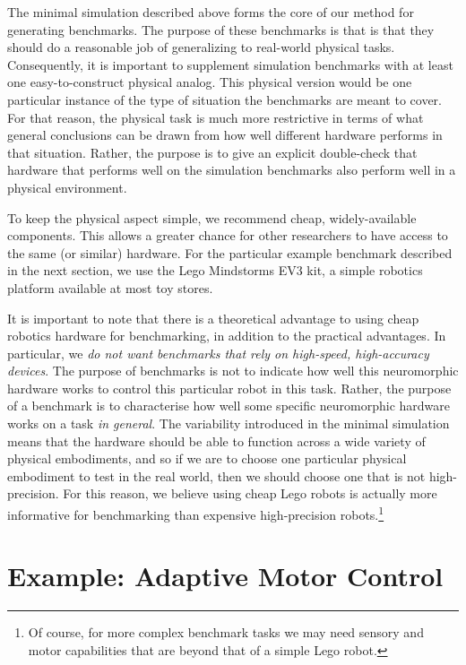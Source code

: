 \documentclass{frontiersSCNS} %
\begin{document}
The minimal simulation described above forms the core of our method for generating benchmarks.
The purpose of these benchmarks is that is that they should do a reasonable job
of generalizing to real-world physical tasks.  Consequently, it is important to
supplement simulation benchmarks with at least one easy-to-construct 
physical analog.  This physical version would be one particular instance of the
type of situation the benchmarks are meant to cover.  For that reason, the physical task
is much more restrictive in terms of what general conclusions can be drawn
from how well different hardware performs in that situation.  Rather, the purpose is to give
an explicit double-check that hardware that performs
well on the simulation benchmarks also perform well in a physical environment.

To keep the physical aspect simple, we recommend cheap, widely-available
components.  This allows a greater chance for other researchers to have
access to the same (or similar) hardware.  For the particular example 
benchmark described in the next section, we use the Lego Mindstorms EV3 kit,
a simple robotics platform available at most toy stores.

It is important to note that there is a theoretical advantage to
using cheap robotics hardware for benchmarking, in addition to the practical
advantages.  In particular, we \emph{do not want benchmarks that rely on
high-speed, high-accuracy devices}.  The purpose of benchmarks
is not to indicate how well this neuromorphic hardware works to control this
particular robot in this task.  Rather, the purpose of a benchmark is to
characterise how well some specific neuromorphic hardware works on a task 
\emph{in general}.  The variability introduced in the minimal simulation means that the hardware
should be able to function across a wide variety of physical embodiments, and
so if we are to choose one particular physical embodiment to test in the
real world, then we should choose one that is not high-precision.
For this reason, we believe using cheap Lego robots is actually more informative
for benchmarking than expensive high-precision robots.\footnote{Of course,
for more complex benchmark tasks we may need sensory and motor capabilities
that are beyond that of a simple Lego robot.}

\section{Example: Adaptive Motor Control}
\end{document}
